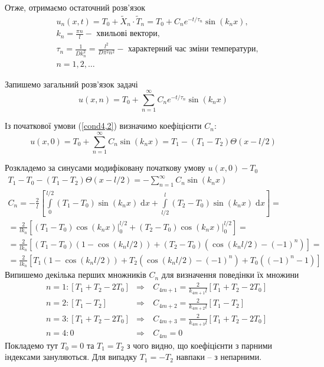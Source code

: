 Отже, отримаємо остаточний розв'язок
\begin{equation}
    \begin{aligned}
        \;&u_n(x,t) = T_0 + \widetilde{X}_n \cdot \widetilde{T}_n = T_0 + C_n e^{-t/\tau_n} \sin(k_n x),\\
        &k_n = \frac{\pi n}{l} - \text{ хвильові вектори}, \\
        &\tau_n = \frac{1}{D k_n^2} = \frac{l^2}{D \pi^2 n^2} - \text{ характерний час зміни температури}, \\
        &n = 1, 2,\ldots
    \end{aligned}
\end{equation}

Запишемо загальний розв'язок задачі
\begin{equation}
    u(x,n) = T_0 + \sum_{n=1}^{\infty}C_n e^{-t/\tau_n} \sin(k_n x)
\end{equation}

Із початкової умови (\ref{cond4,2}) визначимо коефіцієнти $C_n$:
\begin{equation}
    u(x,0) = T_0 + \sum_{n=1}^{\infty}C_n \sin(k_n x) =  T_1 - (T_1 - T_2)\Theta(x - l/2)
\end{equation}

Розкладемо за синусами модифіковану початкову умову $u(x,0) - T_0$ 
\begin{equation*}
    \begin{gathered}
        T_1 - T_0 - (T_1 - T_2)\Theta(x - l/2) = - \sum_{n=1}^{\infty}C_n \sin(k_n x)\\
        C_n = -\frac{2}{l}\left[\int\limits_0^{l/2} (T_1 - T_0)\sin(k_n x) \;\mathrm{d}x + \int\limits_{l/2}^l (T_2 - T_0)\sin(k_n x) \;\mathrm{d}x\right] =\\
        = \frac{2}{lk_n}\left[(T_1 - T_0)\cos(k_n x)\biggr\rvert_0^{l/2} + (T_2 - T_0)\cos(k_n x)\biggr\rvert_0^{l/2}\right] =\\
        = \frac{2}{lk_n}\left[(T_1 - T_0)(1 - \cos(k_n l/2)) + (T_2 - T_0)(\cos(k_n l/2) - (-1)^n)\right] =\\
        = \frac{2}{lk_n}\left[T_1(1 - \cos(k_n l/2)) + T_2(\cos(k_n l/2) - (-1)^n) + T_0 ((-1)^n - 1)\right]
    \end{gathered}
\end{equation*}
Випишемо декілька перших множників $C_n$ для визначення поведінки їх множини
\begin{equation*}
    \begin{aligned}
        &n=1: \left[T_1 + T_2 - 2T_0 \right] &\Rightarrow&\ C_{4m+1} = \frac{2}{k_{4m+1}l}\left[T_1 + T_2 - 2T_0 \right]\\
        &n=2: \left[T_1 - T_2 \right] &\Rightarrow&\ C_{4m+2} = \frac{2}{k_{4m+2}l}\left[T_1 - T_2 \right]\\
        &n=3: \left[T_1 + T_2 - 2T_0 \right] &\Rightarrow&\ C_{4m+3} = \frac{2}{k_{4m+3}l}\left[T_1 + T_2 - 2T_0 \right]\\
        &n=4: 0 &\Rightarrow&\ C_{4m} = 0
    \end{aligned}    
\end{equation*}
Покладемо тут $T_0 = 0$ та $T_1 = T_2$ з чого видно, що коефіцієнти з парними індексами зануляються. Для випадку $T_1 = -T_2$ навпаки -- з непарними.

